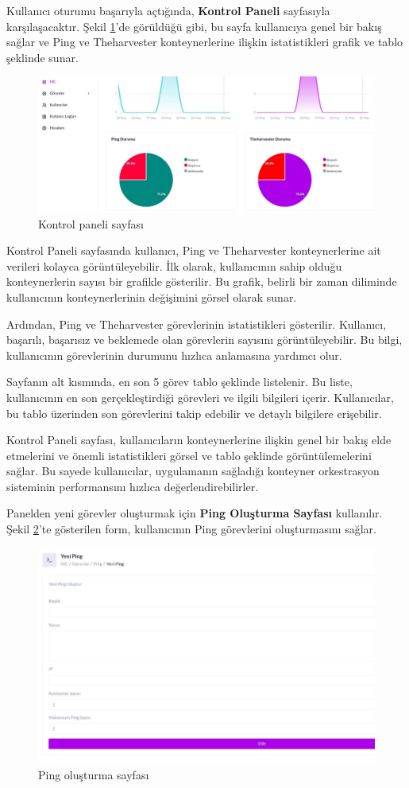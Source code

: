 Kullanıcı oturumu başarıyla açtığında, \textbf{Kontrol Paneli} sayfasıyla karşılaşacaktır. Şekil \ref{fig:dashboard}'de görüldüğü gibi, bu sayfa kullanıcıya genel bir bakış sağlar ve Ping ve Theharvester konteynerlerine ilişkin istatistikleri grafik ve tablo şeklinde sunar.

\begin{figure}[ht]
	\centering
	\includegraphics[width=0.7\linewidth]{images/dashboard.jpeg}
	\caption{Kontrol paneli sayfası}
	\label{fig:dashboard}
\end{figure}

Kontrol Paneli sayfasında kullanıcı, Ping ve Theharvester konteynerlerine ait verileri kolayca görüntüleyebilir. İlk olarak, kullanıcının sahip olduğu konteynerlerin sayısı bir grafikle gösterilir. Bu grafik, belirli bir zaman diliminde kullanıcının konteynerlerinin değişimini görsel olarak sunar.

Ardından, Ping ve Theharvester görevlerinin istatistikleri gösterilir. Kullanıcı, başarılı, başarısız ve beklemede olan görevlerin sayısını görüntüleyebilir. Bu bilgi, kullanıcının görevlerinin durumunu hızlıca anlamasına yardımcı olur.

Sayfanın alt kısmında, en son 5 görev tablo şeklinde listelenir. Bu liste, kullanıcının en son gerçekleştirdiği görevleri ve ilgili bilgileri içerir. Kullanıcılar, bu tablo üzerinden son görevlerini takip edebilir ve detaylı bilgilere erişebilir.

Kontrol Paneli sayfası, kullanıcıların konteynerlerine ilişkin genel bir bakış elde etmelerini ve önemli istatistikleri görsel ve tablo şeklinde görüntülemelerini sağlar. Bu sayede kullanıcılar, uygulamanın sağladığı konteyner orkestrasyon sisteminin performansını hızlıca değerlendirebilirler.

Panelden yeni görevler oluşturmak için \textbf{Ping Oluşturma Sayfası} kullanılır. Şekil \ref{fig:create}'te gösterilen form, kullanıcının Ping görevlerini oluşturmasını sağlar.

\begin{figure}[ht]
	\centering
	\includegraphics[width=0.7\linewidth]{images/create.jpeg}
	\caption{Ping oluşturma sayfası}
	\label{fig:create}
\end{figure}

